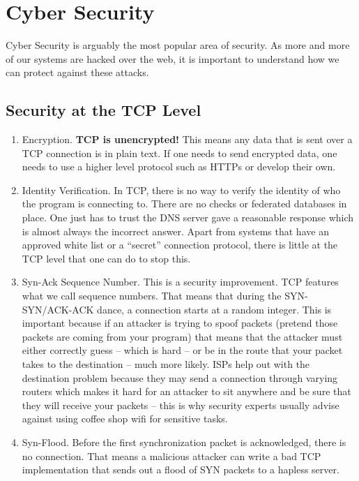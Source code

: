 \section{Cyber Security}

Cyber Security is arguably the most popular area of security.
As more and more of our systems are hacked over the web, it is important to understand how we can protect against these attacks.

\subsection{Security at the TCP Level}

\begin{enumerate}
\item Encryption.
  \textbf{TCP is unencrypted!} This means any data that is sent over a TCP connection is in plain text.
  If one needs to send encrypted data, one needs to use a higher level protocol such as HTTPs or develop their own.
\item Identity Verification.
  In TCP, there is no way to verify the identity of who the program is connecting to.
  There are no checks or federated databases in place.
  One just has to trust the DNS server gave a reasonable response which is almost always the incorrect answer.
  Apart from systems that have an approved white list or a ``secret'' connection protocol, there is little at the TCP level that one can do to stop this.
\item Syn-Ack Sequence Number.
  This is a security improvement.
  TCP features what we call sequence numbers.
  That means that during the SYN-SYN/ACK-ACK dance, a connection starts at a random integer.
  This is important because if an attacker is trying to spoof packets (pretend those packets are coming from your program) that means that the attacker must either correctly guess -- which is hard -- or be in the route that your packet takes to the destination -- much more likely.
  ISPs help out with the destination problem because they may send a connection through varying routers which makes it hard for an attacker to sit anywhere and be sure that they will receive your packets -- this is why security experts usually advise against using coffee shop wifi for sensitive tasks.
\item Syn-Flood.
  Before the first synchronization packet is acknowledged, there is no connection.
  That means a malicious attacker can write a bad TCP implementation that sends out a flood of SYN packets to a hapless server.

\end{enumerate}
